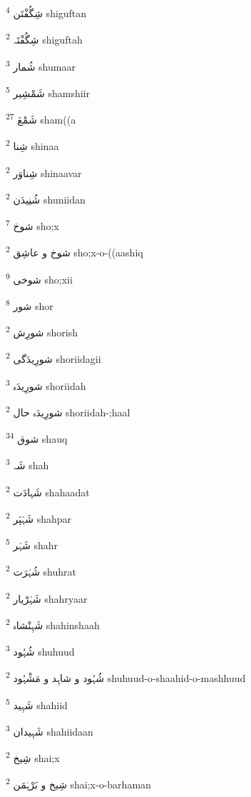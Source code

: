 \documentclass[12pt]{article}
\begin{document}
\begin{RTL}
\begin{multicols}{5}
{\ur شِگُفْتَن}   \textsuperscript{4} shiguftan

{\ur شِگُفْتَہ}   \textsuperscript{2} shiguftah

{\ur شُمار}   \textsuperscript{3} shumaar

{\ur شَمْشِیر}   \textsuperscript{5} shamshiir

{\ur شَمْعَ}   \textsuperscript{27} sham((a

{\ur شِنا}   \textsuperscript{2} shinaa

{\ur شِناوَر}   \textsuperscript{2} shinaavar

{\ur شُنِیدَن}   \textsuperscript{2} shuniidan

{\ur شوخ}   \textsuperscript{7} sho;x

{\ur شوخ و عاشِق}   \textsuperscript{2} sho;x-o-((aashiq

{\ur شوخی}   \textsuperscript{9} sho;xii

{\ur شور}   \textsuperscript{8} shor

{\ur شورِش}   \textsuperscript{2} shorish

{\ur شورِیدَگی}   \textsuperscript{2} shoriidagii

{\ur شورِیدَہ}   \textsuperscript{3} shoriidah

{\ur شورِیدَہ حال}   \textsuperscript{2} shoriidah-;haal

{\ur شوق}   \textsuperscript{34} shauq

{\ur شَہ}   \textsuperscript{3} shah

{\ur شَہادَت}   \textsuperscript{2} shahaadat

{\ur شَہْپَر}   \textsuperscript{2} shahpar

{\ur شَہْر}   \textsuperscript{5} shahr

{\ur شُہْرَت}   \textsuperscript{2} shuhrat

{\ur شَہْرْیار}   \textsuperscript{2} shahryaar

{\ur شَہِنْشاہ}   \textsuperscript{2} shahinshaah

{\ur شُہُود}   \textsuperscript{3} shuhuud

{\ur شُہُود و شاہِد و مَشْہُود}   \textsuperscript{2} shuhuud-o-shaahid-o-mashhuud

{\ur شَہِید}   \textsuperscript{5} shahiid

{\ur شَہِیدان}   \textsuperscript{3} shahiidaan

{\ur شِیخ}   \textsuperscript{2} shai;x

{\ur شِیخ و بَرْہَمَن}   \textsuperscript{2} shai;x-o-barhaman


\end{multicols}
\end{RTL}
\end{document}
